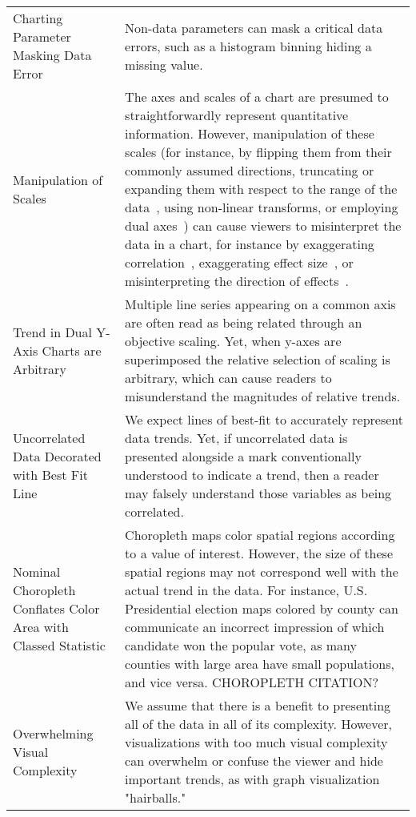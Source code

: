 \begin{longtable}{p{3cm}p{14cm}}
 \rowcolor{colorc-opaque}Charting Parameter Masking Data Error & Non-data parameters can mask a critical data errors, such as a histogram binning hiding a missing value. \cite{correll2018looks}\\
 \rowcolor{colorc}Manipulation of \newline Scales & The axes and scales of a chart are presumed to straightforwardly represent quantitative information. However, manipulation of these scales (for instance, by flipping them from their commonly assumed directions, truncating or expanding them with respect to the range of the data~\cite{pandey2015deceptive, correll2017black, cleveland1982variables, ritchie2019lie, correll2019truncating}, using non-linear transforms, or employing dual axes~\cite{KindlmannAlgebraicVisPedagogyPDV2016, cairo2015graphics}) can cause viewers to misinterpret the data in a chart, for instance by exaggerating correlation~\cite{cleveland1982variables}, exaggerating effect size~\cite{correll2019truncating,pandey2015deceptive}, or misinterpreting the direction of effects~\cite{pandey2015deceptive}. \cite{cairo2015graphics,correll2017black,correll2019truncating,cleveland1982variables,KindlmannAlgebraicVisPedagogyPDV2016,pandey2015deceptive,ritchie2019lie}\\
 \rowcolor{colorc-opaque}Trend in Dual Y-Axis Charts are Arbitrary  & Multiple line series appearing on a common axis are often read as being related through an objective scaling. Yet, when y-axes are superimposed the relative selection of scaling is arbitrary, which can cause readers to misunderstand the magnitudes of relative trends. \cite{KindlmannAlgebraicVisPedagogyPDV2016, cairo2015graphics}\\
 \rowcolor{colorc}Uncorrelated Data Decorated with Best Fit Line  & We expect lines of best-fit to accurately represent data trends. Yet, if uncorrelated data is presented alongside a mark conventionally understood to indicate a trend, then a reader may falsely understand those variables as being correlated.   \\
 \rowcolor{colorc-opaque}Nominal Choropleth Conflates Color Area with Classed Statistic & Choropleth maps color spatial regions according to a value of interest. However, the size of these spatial regions may not correspond well with the actual trend in the data. For instance, U.S. Presidential election maps colored by county can communicate an incorrect impression of which candidate won the popular vote, as many counties with large area have small populations, and vice versa. \cite{gastner2005maps} CHOROPLETH CITATION?\\
 \rowcolor{colorc}Overwhelming Visual Complexity & We assume that there is a benefit to presenting all of the data in all of its complexity. However, visualizations with too much visual complexity can overwhelm or confuse the viewer and hide important trends, as with graph visualization "hairballs." \cite{hofmann2012graphical, greadability}\\
  


\end{longtable}
